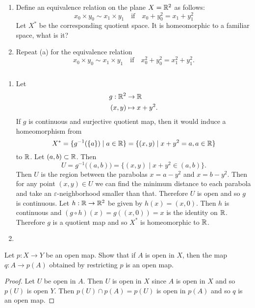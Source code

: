 \begin{ex}{22.4}
    ${}$
    \begin{enumerate}
        \item Define an equivalence relation on the plane $X=\mathbb{R}^2$ as follows:
            $$x_0\times y_0\sim x_1\times y_1\quad\text{if}\quad x_0+y_0^2=x_1+y_1^2$$
            Let $X^*$ be the corresponding quotient space. It is homeomorphic to a familiar space, what is it?
        \item Repeat (a) for the equivalence relation 
            $$x_0\times y_0\sim x_1\times y_1\quad\text{if}\quad x_0^2+y_0^2=x_1^2+y_1^2.$$
    \end{enumerate}
\end{ex}
\begin{sol}
    ${}$
    \begin{enumerate}
        \item Let
        \begin{align*}
            g:\mathbb{R}^2&\to\mathbb{R}\\
            (x,y)&\mapsto x+y^2.
        \end{align*}
        If $g$ is continuous and surjective quotient map, then it would induce a homeomorphism from
        $$X^*=\{g^{-1}(\{a\})\mid a\in\mathbb{R}\}=\{(x,y)\mid x+y^2=a, a\in\mathbb{R}\}$$
        to $\mathbb{R}$. Let $(a,b)\subset\mathbb{R}$. Then
        $$U = g^{-1}\big((a,b)\big)=\{(x,y)\mid x+y^2\in (a,b)\}.$$
        Then $U$ is the region between the parabolas $x=a-y^2$ and $x=b-y^2$. 
        Then for any point $(x,y)\in U$ we can find the minimum distance to each parabola and take an $\varepsilon$-neighborhood smaller than that.
        Therefore $U$ is open and so $g$ is continuous. Let $h:\mathbb{R}\to\mathbb{R}^2$ be given by $h(x)=(x,0)$. 
        Then $h$ is continuous and $(g\circ h)(x)=g((x,0))=x$ is the identity on $\mathbb{R}$.
        Therefore $g$ is a quotient map and so $X^*$ is homeomorphic to $\mathbb{R}$.

        \item
    \end{enumerate}
\end{sol}

\begin{ex}{22.5}
    Let $p:X\to Y$ be an open map. Show that if $A$ is open in $X$, then the map $q:A\to p(A)$ obtained by restricting $p$ is an open map.
\end{ex}
\begin{proof}
    Let $U$ be open in $A$. Then $U$ is open in $X$ since $A$ is open in $X$ and so $p(U)$ is open $Y$. Then $p(U)\cap p(A)=p(U)$ is open in $p(A)$ and so $q$ is an open map.
\end{proof}
